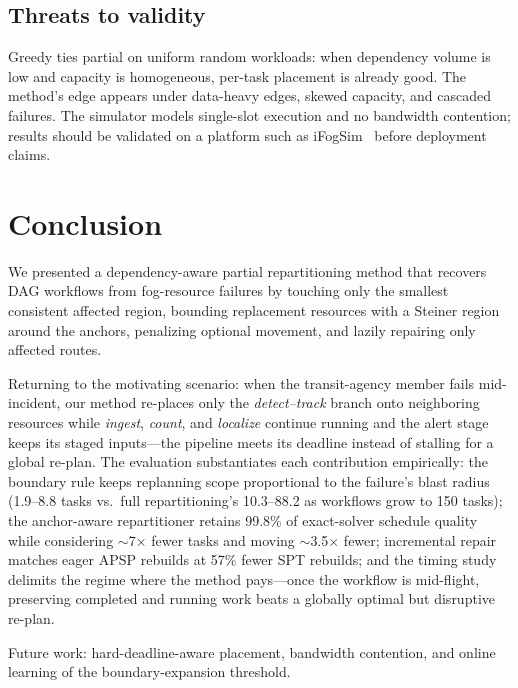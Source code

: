\documentclass[conference]{IEEEtran}
\theoremstyle{remark}
\begin{document}
\subsection{Threats to validity}

Greedy ties partial on uniform random workloads: when dependency volume is
low and capacity is homogeneous, per-task placement is already good. The
method's edge appears under data-heavy edges, skewed capacity, and cascaded
failures. The simulator models single-slot execution and no bandwidth
contention; results should be validated on a platform such as
iFogSim~\cite{ifogsim} before deployment claims.

\section{Conclusion}

We presented a dependency-aware partial repartitioning method that recovers
DAG workflows from fog-resource failures by touching only the smallest
consistent affected region, bounding replacement resources with a
Steiner region around the anchors, penalizing optional movement, and
lazily repairing only affected routes.

Returning to the motivating scenario: when the transit-agency member fails
mid-incident, our method re-places only the \emph{detect--track} branch
onto neighboring resources while \emph{ingest}, \emph{count}, and
\emph{localize} continue running and the alert stage keeps its staged
inputs---the pipeline meets its deadline instead of stalling for a global
re-plan. The evaluation substantiates each contribution empirically: the
boundary rule keeps replanning scope proportional to the failure's blast
radius (1.9--8.8 tasks vs.\ full repartitioning's 10.3--88.2 as workflows
grow to 150 tasks); the anchor-aware repartitioner retains 99.8\% of
exact-solver schedule quality while considering $\sim$7$\times$ fewer
tasks and moving $\sim$3.5$\times$ fewer; incremental repair matches
eager APSP rebuilds at 57\% fewer SPT rebuilds; and the timing study
delimits the regime where the method pays---once the workflow is
mid-flight, preserving completed and running work beats a globally
optimal but disruptive re-plan.

Future work: hard-deadline-aware placement, bandwidth contention, and
online learning of the boundary-expansion threshold.
\end{document}

